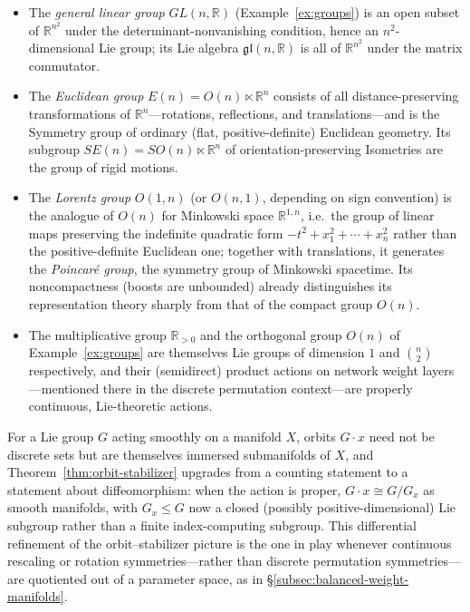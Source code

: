 \documentclass[mathematics,review,submit,moreauthors]{Definitions/mdpi}
\begin{document}
\begin{Example}
\label{ex:lie-groups}
\begin{itemize}
    \item The \emph{general linear group} $GL(n,\mathbb{R})$
    (Example~\ref{ex:groups}) is an open subset of $\mathbb{R}^{n^2}$ under
    the determinant-nonvanishing condition, hence an $n^2$-dimensional Lie
    group; its Lie algebra $\mathfrak{gl}(n,\mathbb{R})$ is all of
    $\mathbb{R}^{n^2}$ under the matrix commutator.
    \item The \emph{Euclidean group} $E(n) = O(n) \ltimes \mathbb{R}^n$
    consists of all distance-preserving transformations of
    $\mathbb{R}^n$---rotations, reflections, and translations---and is the
    Symmetry group of ordinary (flat, positive-definite) Euclidean geometry.
    Its subgroup $SE(n) = SO(n) \ltimes \mathbb{R}^n$ of orientation-preserving
    Isometries are the group of rigid motions.
    \item The \emph{Lorentz group} $O(1,n)$ (or $O(n,1)$, depending on sign
    convention) is the analogue of $O(n)$ for Minkowski space
    $\mathbb{R}^{1,n}$, i.e.\ the group of linear maps preserving the
    indefinite quadratic form $-t^2 + x_1^2 + \cdots + x_n^2$ rather than the
    positive-definite Euclidean one; together with translations, it generates
    the \emph{Poincar\'e group}, the symmetry group of Minkowski spacetime.
    Its noncompactness (boosts are unbounded) already distinguishes its
    representation theory sharply from that of the compact group $O(n)$.
    \item The multiplicative group $\mathbb{R}_{>0}$ and the orthogonal group
    $O(n)$ of Example~\ref{ex:groups} are themselves Lie groups of dimension
    $1$ and $\binom{n}{2}$ respectively, and their (semidirect) product
    actions on network weight layers---mentioned there in the discrete
    permutation context---are properly continuous, Lie-theoretic actions.
\end{itemize}
\end{Example}

For a Lie group $G$ acting smoothly on a manifold $X$, orbits
$G \cdot x$ need not be discrete sets but are themselves immersed
submanifolds of $X$, and Theorem~\ref{thm:orbit-stabilizer} upgrades from a
counting statement to a statement about diffeomorphism: when the action is
proper, $G \cdot x \cong G / G_x$ as smooth manifolds, with $G_x \leq G$ now
a closed (possibly positive-dimensional) Lie subgroup rather than a finite
index-computing subgroup. This differential refinement of the
orbit--stabilizer picture is the one in play whenever continuous rescaling
or rotation symmetries---rather than discrete permutation
symmetries---are quotiented out of a parameter space, as in
\S\ref{subsec:balanced-weight-manifolds}.
\end{document}
